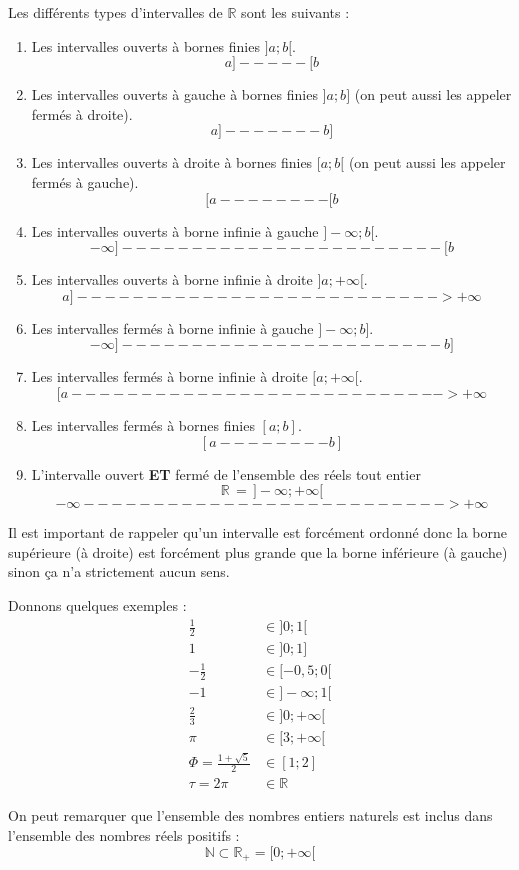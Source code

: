 \documentclass[a4paper, 11pt, twoside]{book}
\newcommand{\N}{\mathbb{N}}
\newcommand{\R}{\mathbb{R}}
\begin{document}
Les différents types d'intervalles de \(\R\) sont les
suivants :
\begin{enumerate}
\item Les intervalles ouverts à bornes finies \(]a ; b[\).
\[a]-----[b\]
\item Les intervalles ouverts à gauche à bornes finies \(]a ; b]\) (on
peut aussi les appeler fermés à droite).
\[a]-------b]\]
\item Les intervalles ouverts à droite à bornes finies \([a ; b[\) (on
peut aussi les appeler fermés à gauche).
\[[a--------[b\]
\item Les intervalles ouverts à borne infinie à gauche \(]-\infty ;
      b[\).
\[-\infty ]-----------------------[b\]
\item Les intervalles ouverts à borne infinie à droite \(]a ;
      +\infty[\).
\[a]-------------------------->+\infty\]
\item Les intervalles fermés à borne infinie à gauche \(]-\infty ; b]\).
\[-\infty ]-----------------------b]\]
\item Les intervalles fermés à borne infinie à droite \([a ; +\infty[\).
\[[a--------------------------->+\infty\]
\item Les intervalles fermés à bornes finies \([a ; b]\).
\[[a--------b]\]
\item L'intervalle ouvert \textbf{ET} fermé de l'ensemble des réels tout
entier \[\R\,=\,]-\infty ; +\infty[\]
\[-\infty --------------------------> +\infty\]
\end{enumerate}

Il est important de rappeler qu'un intervalle est forcément ordonné
donc la borne supérieure (à droite) est forcément plus grande que
la borne inférieure (à gauche) sinon ça n'a strictement aucun
sens.

Donnons quelques exemples :
\begin{align*}
\frac{1}{2} &\in ]0 ; 1[ \\
1 &\in ]0 ; 1] \\
-\frac{1}{2} &\in [-0,5 ; 0[\\
-1 &\in ]-\infty ; 1[\\
\frac{2}{3} &\in ]0 ; +\infty[ \\
\pi &\in [3 ; +\infty[ \\
\Phi = \frac{1 + \sqrt{5}}{2} &\in [1 ; 2] \\
\tau = 2\pi &\in \R
\end{align*}

On peut remarquer que l'ensemble des nombres entiers naturels est
inclus dans l'ensemble des nombres réels positifs :
\[\N\subset \R_{+} = [0; +\infty[\]
\end{document}
